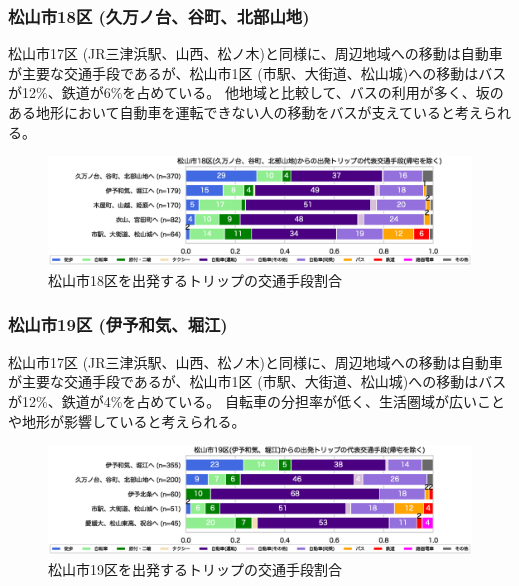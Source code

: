 \documentclass[a4paper,12pt, uplatex]{jsbook}
\begin{document}
\subsubsection{松山市18区 (久万ノ台、谷町、北部山地)}
松山市17区 (JR三津浜駅、山西、松ノ木)と同様に、周辺地域への移動は自動車が主要な交通手段であるが、松山市1区 (市駅、大街道、松山城)への移動はバスが12\%、鉄道が6\%を占めている。
他地域と比較して、バスの利用が多く、坂のある地形において自動車を運転できない人の移動をバスが支えていると考えられる。
%
\begin{figure}[H]
    \centering
    \includegraphics[width=1.0\textwidth]{picture/mode_share_松山市18区.eps}
    \caption{松山市18区を出発するトリップの交通手段割合}
    \label{fig:mode_share_18}
\end{figure}

\subsubsection{松山市19区 (伊予和気、堀江)}
松山市17区 (JR三津浜駅、山西、松ノ木)と同様に、周辺地域への移動は自動車が主要な交通手段であるが、松山市1区 (市駅、大街道、松山城)への移動はバスが12\%、鉄道が4\%を占めている。
自転車の分担率が低く、生活圏域が広いことや地形が影響していると考えられる。
%
\begin{figure}[H]
    \centering
    \includegraphics[width=1.0\textwidth]{picture/mode_share_松山市19区.eps}
    \caption{松山市19区を出発するトリップの交通手段割合}
    \label{fig:mode_share_19}
\end{figure}
\end{document}
